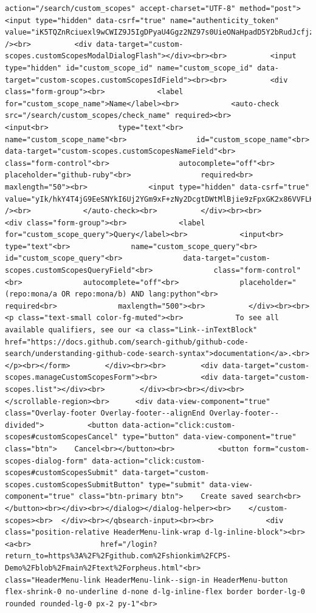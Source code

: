 \documentclass[
  letterpaper,
]{book}
\begin{document}
\begin{verbatim}
action="/search/custom_scopes" accept-charset="UTF-8" method="post"><input type="hidden" data-csrf="true" name="authenticity_token" value="iK5TQZnRciuexl9wCWIZ9J5IgDPyaU4Ggz2NZ97s0UieONaHpadD5Y2bRudJcfjzhgF5rPaHBPwqzYMY20ESIw==" /><br>          <div data-target="custom-scopes.customScopesModalDialogFlash"></div><br><br>          <input type="hidden" id="custom_scope_id" name="custom_scope_id" data-target="custom-scopes.customScopesIdField"><br><br>          <div class="form-group"><br>            <label for="custom_scope_name">Name</label><br>            <auto-check src="/search/custom_scopes/check_name" required><br>              <input<br>                type="text"<br>                name="custom_scope_name"<br>                id="custom_scope_name"<br>                data-target="custom-scopes.customScopesNameField"<br>                class="form-control"<br>                autocomplete="off"<br>                placeholder="github-ruby"<br>                required<br>                maxlength="50"><br>              <input type="hidden" data-csrf="true" value="yIk/hkY4T4jG9EeSNYkI6Uj2YGm9xF+zNy2DcgtDWtMlBjie9zFpxGK2x86VVFLKOa+tEfBQ/JWnADPL/fnehA==" /><br>            </auto-check><br>          </div><br><br>          <div class="form-group"><br>            <label for="custom_scope_query">Query</label><br>            <input<br>              type="text"<br>              name="custom_scope_query"<br>              id="custom_scope_query"<br>              data-target="custom-scopes.customScopesQueryField"<br>              class="form-control"<br>              autocomplete="off"<br>              placeholder="(repo:mona/a OR repo:mona/b) AND lang:python"<br>              required<br>              maxlength="500"><br>          </div><br><br>          <p class="text-small color-fg-muted"><br>            To see all available qualifiers, see our <a class="Link--inTextBlock" href="https://docs.github.com/search-github/github-code-search/understanding-github-code-search-syntax">documentation</a>.<br>          </p><br></form>        </div><br><br>        <div data-target="custom-scopes.manageCustomScopesForm"><br>          <div data-target="custom-scopes.list"></div><br>        </div><br><br></div><br>      </scrollable-region><br>      <div data-view-component="true" class="Overlay-footer Overlay-footer--alignEnd Overlay-footer--divided">          <button data-action="click:custom-scopes#customScopesCancel" type="button" data-view-component="true" class="btn">    Cancel<br></button><br>          <button form="custom-scopes-dialog-form" data-action="click:custom-scopes#customScopesSubmit" data-target="custom-scopes.customScopesSubmitButton" type="submit" data-view-component="true" class="btn-primary btn">    Create saved search<br></button><br></div><br></dialog></dialog-helper><br>    </custom-scopes><br>  </div><br></qbsearch-input><br><br>            <div class="position-relative HeaderMenu-link-wrap d-lg-inline-block"><br>              <a<br>                href="/login?return_to=https%3A%2F%2Fgithub.com%2Fshionkim%2FCPS-Demo%2Fblob%2Fmain%2Ftext%2Forpheus.html"<br>                class="HeaderMenu-link HeaderMenu-link--sign-in HeaderMenu-button flex-shrink-0 no-underline d-none d-lg-inline-flex border border-lg-0 rounded rounded-lg-0 px-2 py-1"<br>                
\end{verbatim}
\end{document}
